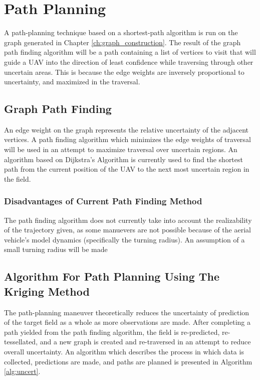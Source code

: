 \chapter{Path Planning}
A path-planning technique based on a shortest-path algorithm is run on the graph generated in Chapter \ref{ch:graph_construction}. The result of the graph path finding algorithm will be a path containing a list of vertices to visit that will guide a UAV into the direction of least confidence while traversing through other uncertain areas. This is because the edge weights are inversely proportional to uncertainty, and maximized in the traversal. 

\section{Graph Path Finding}
An edge weight on the graph represents the relative uncertainty of the adjacent vertices. A path finding algorithm which minimizes the edge weights of traversal will be used in an attempt to maximize traversal over uncertain regions. An algorithm based on Dijkstra's Algorithm is currently used to find the shortest path from the current position of the UAV to the next most uncertain region in the field. 

\subsection{Disadvantages of Current Path Finding Method}
The path finding algorithm does not currently take into account the realizability of the trajectory given, as some manuevers are not possible because of the aerial vehicle's model dynamics (specifically the turning radius). An assumption of a small turning radius will be made

\section{Algorithm For Path Planning Using The Kriging Method}
The path-planning maneuver theoretically reduces the uncertainty of prediction of the target field as a whole as more observations are made. After completing a path yielded from the path finding algorithm, the field is re-predicted, re-tessellated, and a new graph is created and re-traversed in an attempt to reduce overall uncertainty. An algorithm which describes the process in which data is collected, predictions are made, and paths are planned is presented in Algorithm \ref{alg:uncert}.

